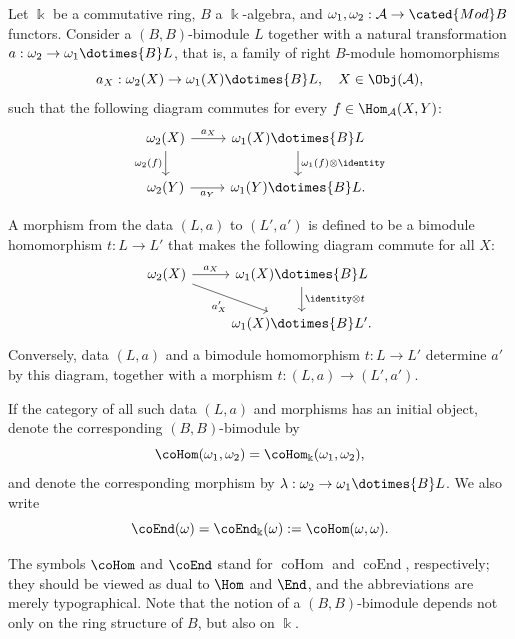 \begin{definition}\label{def:cogebra-L-universal}
	Let $\Bbbk$ be a commutative ring, $B$ a $\Bbbk$-algebra, and
	$\omega_1,\omega_2:\mathcal{A}\to\cated{Mod}B$ functors. Consider a
	$(B,B)$-bimodule $L$ together with a natural transformation
	$a:\omega_2\to\omega_1\dotimes{B}L$, that is, a family of right
	$B$-module homomorphisms
	\[ a_X: \omega_2(X) \to \omega_1(X) \dotimes{B} L, \quad X \in \Obj(\mathcal{A}), \]
	such that the following diagram commutes for every
	$f\in\Hom_{\mathcal{A}}(X,Y)$:
	\[\begin{tikzcd}
		\omega_2(X) \arrow[r, "a_X"] \arrow[d, "{\omega_2(f)}"'] & \omega_1(X) \dotimes{B} L \arrow[d, "{\omega_1(f) \otimes \identity}"] \\
		\omega_2(Y) \arrow[r, "a_Y"'] & \omega_1(Y) \dotimes{B} L.
	\end{tikzcd}\]

	A morphism from the data $(L,a)$ to $(L',a')$ is defined to be a bimodule
	homomorphism $t:L\to L'$ that makes the following diagram commute for all
	$X$:
	\[\begin{tikzcd}
		\omega_2(X) \arrow[r, "{a_X}"] \arrow[rd, "{a'_X}"'] & \omega_1(X) \dotimes{B} L \arrow[d, "{\identity \otimes t}"] \\
		& \omega_1(X) \dotimes{B} L'.
	\end{tikzcd}\]
	Conversely, data $(L,a)$ and a bimodule homomorphism $t:L\to L'$ determine
	$a'$ by this diagram, together with a morphism $t:(L,a)\to(L',a')$.

	If the category of all such data $(L,a)$ and morphisms has an initial
	object, denote the corresponding $(B,B)$-bimodule by
	\[ \coHom(\omega_1, \omega_2) = \coHom_{\Bbbk}(\omega_1, \omega_2), \]
	and denote the corresponding morphism by
	$\lambda:\omega_2\to\omega_1\dotimes{B}L$. We also write
	\[ \coEnd(\omega) = \coEnd_{\Bbbk}(\omega) := \coHom(\omega, \omega). \]
\end{definition}

The symbols $\coHom$ and $\coEnd$ stand for $\operatorname{coHom}$ and
$\operatorname{coEnd}$, respectively; they should be viewed as dual to
$\Hom$ and $\End$, and the abbreviations are merely typographical. Note that
the notion of a $(B,B)$-bimodule depends not only on the ring structure of
$B$, but also on $\Bbbk$.

